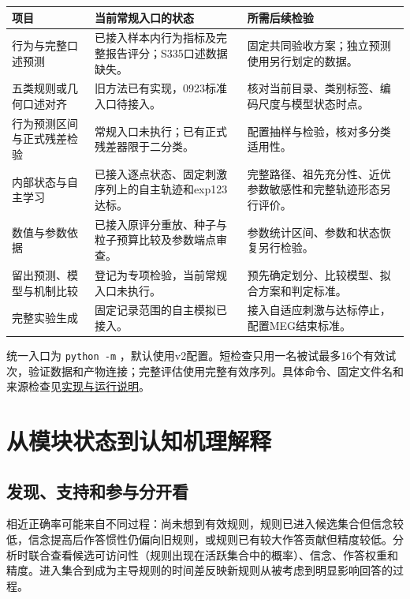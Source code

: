 \documentclass[12pt]{article}
\begin{document}
{\small
\begin{longtable}{L{2.6cm}L{6.1cm}L{4.6cm}}
\toprule
项目 & 当前常规入口的状态 & 所需后续检验\\
\midrule
\endhead
行为与完整口述预测 & 已接入样本内行为指标及完整报告评分；S335口述数据缺失。 & 固定共同验收方案；独立预测使用另行划定的数据。\\
五类规则或几何口述对齐 & 旧方法已有实现，0923标准入口待接入。 & 核对当前目录、类别标签、编码尺度与模型状态时点。\\
行为预测区间与正式残差检验 & 常规入口未执行；已有正式残差器限于二分类。 & 配置抽样与检验，核对多分类适用性。\\
内部状态与自主学习 & 已接入逐点状态、固定刺激序列上的自主轨迹和exp123达标。 & 完整路径、祖先充分性、近优参数敏感性和完整轨迹形态另行评价。\\
数值与参数依据 & 已接入原评分重放、种子与粒子预算比较及参数端点审查。 & 参数统计区间、参数和状态恢复另行检验。\\
留出预测、模型与机制比较 & 登记为专项检验，当前常规入口未执行。 & 预先确定划分、比较模型、拟合方案和判定标准。\\
完整实验生成 & 固定记录范围的自主模拟已接入。 & 接入自适应刺激与达标停止，配置MEG结束标准。\\
\bottomrule
\end{longtable}
}


{\raggedright 统一入口为 \texttt{python -m}\allowbreak{} ，默认使用v2配置。短检查只用一名被试最多16个有效试次，验证数据和产物连接；完整评估使用完整有效序列。具体命令、固定文件名和来源检查见\href{model_0923_implementation.md}{实现与运行说明}。\par}

\section{从模块状态到认知机理解释}
\label{sec:interpretation}

\subsection{发现、支持和参与分开看}

相近正确率可能来自不同过程：尚未想到有效规则，规则已进入候选集合但信念较低，信念提高后作答惯性仍偏向旧规则，或规则已有较大作答贡献但精度较低。分析时联合查看候选可访问性（规则出现在活跃集合中的概率）、信念、作答权重和精度。进入集合到成为主导规则的时间差反映新规则从被考虑到明显影响回答的过程。
\end{document}
